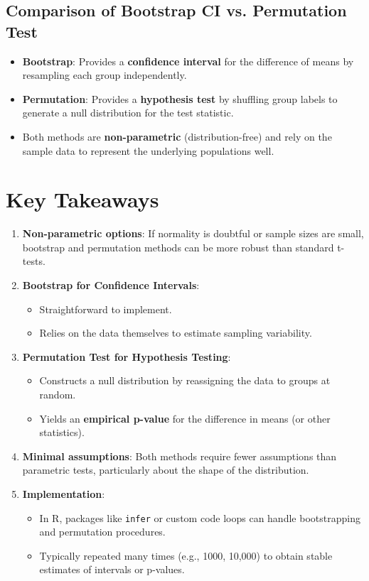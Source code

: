 \documentclass[10pt]{extarticle}
\begin{document}
\subsection{Comparison of Bootstrap CI vs. Permutation Test}

\begin{itemize}
    \item \textbf{Bootstrap}: Provides a \textbf{confidence interval} for the difference of means by resampling each group independently.
    \item \textbf{Permutation}: Provides a \textbf{hypothesis test} by shuffling group labels to generate a null distribution for the test statistic.
    \item Both methods are \textbf{non-parametric} (distribution-free) and rely on the sample data to represent the underlying populations well.
\end{itemize}

\bigskip

\section{Key Takeaways}
\begin{enumerate}
    \item \textbf{Non-parametric options}: If normality is doubtful or sample sizes are small, bootstrap and permutation methods can be more robust than standard t-tests.
    \item \textbf{Bootstrap for Confidence Intervals}:
    \begin{itemize}
        \item Straightforward to implement.
        \item Relies on the data themselves to estimate sampling variability.
    \end{itemize}
    \item \textbf{Permutation Test for Hypothesis Testing}:
    \begin{itemize}
        \item Constructs a null distribution by reassigning the data to groups at random.
        \item Yields an \textbf{empirical p-value} for the difference in means (or other statistics).
    \end{itemize}
    \item \textbf{Minimal assumptions}: Both methods require fewer assumptions than parametric tests, particularly about the shape of the distribution.
    \item \textbf{Implementation}:
    \begin{itemize}
        \item In R, packages like \texttt{infer} or custom code loops can handle bootstrapping and permutation procedures.
        \item Typically repeated many times (e.g., 1000, 10,000) to obtain stable estimates of intervals or p-values.
    \end{itemize}
\end{enumerate}
\end{document}
